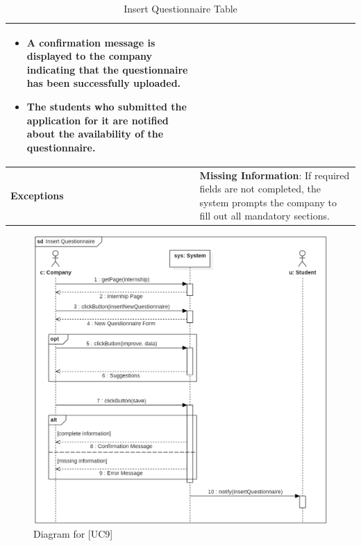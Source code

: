 \begin{table}[H]
\begin{tabular}{|p{4cm}|p{11cm}|}
{    \begin{itemize}
        \item A confirmation message is displayed to the company indicating that the questionnaire has been successfully uploaded.
        \item The students who submitted the application for it are notified about the availability of the questionnaire.
    \end{itemize}} \\ \hline
    \textbf{Exceptions} & 
    \textbf{Missing Information}: If required fields are not completed, the system prompts the company to fill out all mandatory sections. \\ \hline
    \end{tabular}
    \caption{Insert Questionnaire Table}
\end{table}

\begin{figure} [H]
    \centering
    \includegraphics[width=1\linewidth]{Use Cases Images/insert_questionnaire.png}
    \caption{Diagram for [UC9]}
    \label{fig: Insert Questionnaire Diagram}
\end{figure}



